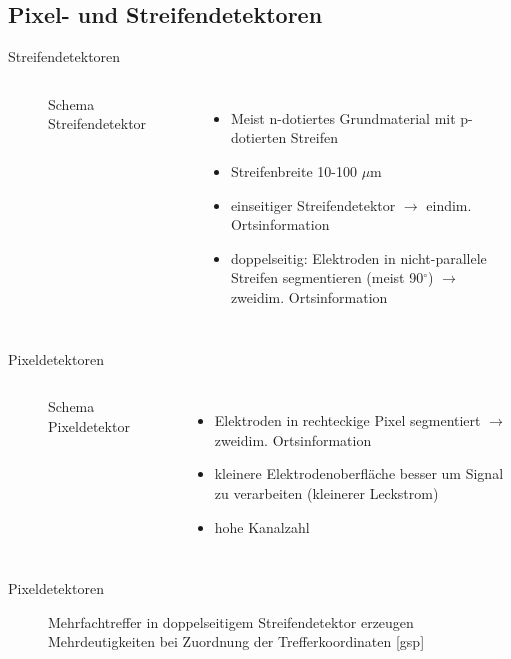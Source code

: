 \subsection[]{Pixel- und Streifendetektoren}


\begin{frame}{Streifendetektoren}
	\begin{columns}[T]
			\begin{figure}[htbp]
			  \centering
			   
			  \caption{Schema Streifendetektor}
			\end{figure}
	    	\begin{itemize}
			  \item Meist n-dotiertes Grundmaterial mit p-dotierten Streifen
			  \item Streifenbreite 10-100 $\mu$m
			  \item einseitiger Streifendetektor $\rightarrow$ eindim. Ortsinformation
			  \item doppelseitig: Elektroden in nicht-parallele Streifen segmentieren (meist 90$^\circ$)
			  $\rightarrow$ zweidim. Ortsinformation
			\end{itemize}
    \end{columns}
\end{frame}

\begin{frame}{Pixeldetektoren}
	\begin{columns}[T]
			\begin{figure}[htbp]
			  \centering
			  
			  \caption{Schema Pixeldetektor}
			\end{figure}	
	    	\begin{itemize}
			  \item Elektroden in rechteckige Pixel segmentiert $\rightarrow$ zweidim. Ortsinformation
			  \item kleinere Elektrodenoberfläche besser um Signal zu verarbeiten (kleinerer Leckstrom)
			  \item hohe Kanalzahl
			\end{itemize}
    \end{columns}
\end{frame}


\begin{frame}{Pixeldetektoren}
			\begin{figure}[htbp]
			  \centering
			  
			  \caption{Mehrfachtreffer in doppelseitigem Streifendetektor erzeugen Mehrdeutigkeiten bei Zuordnung
			der Trefferkoordinaten [gsp]}
			\end{figure}	
\end{frame}


